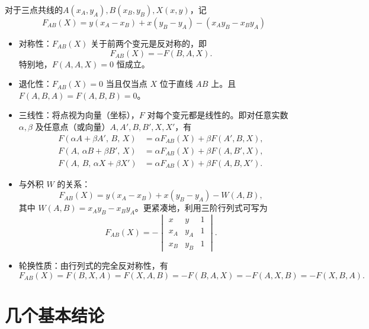 \begin{definition}[直线式 $F$]
    对于三点共线的$A(x_A,y_A),B(x_B,y_B),X(x,y)$，记
    \[F_{AB}(X)=y(x_A-x_B)+x(y_B-y_A)-(x_Ay_B-x_By_A)\]
\end{definition}
\begin{itemize}
    \item 对称性：$F_{AB}(X)$ 关于前两个变元是反对称的，即
    $$ F_{AB}(X) = -F(B,A,X). $$
    特别地，$F(A,A,X)=0$ 恒成立。
    \item 退化性：$F_{AB}(X)=0$ 当且仅当点 $X$ 位于直线 $AB$ 上。且 $F(A,B,A)=F(A,B,B)=0$。
    \item 三线性：将点视为向量（坐标），$F$ 对每个变元都是线性的。即对任意实数 $\alpha,\beta$ 及任意点（或向量）$A,A',B,B',X,X'$，有
    \begin{align*}
        F(\alpha A+\beta A',\,B,\,X) &= \alpha F_{AB}(X) + \beta F(A',B,X), \\
        F(A,\,\alpha B+\beta B',\,X) &= \alpha F_{AB}(X) + \beta F(A,B',X), \\
        F(A,\,B,\,\alpha X+\beta X') &= \alpha F_{AB}(X) + \beta F(A,B,X').
    \end{align*}
    \item 与外积 $W$ 的关系：
    $$ F_{AB}(X) = y(x_A-x_B) + x(y_B-y_A) - W(A,B), $$
    其中 $W(A,B)=x_Ay_B-x_By_A$。更紧凑地，利用三阶行列式可写为
    $$ F_{AB}(X) = -\begin{vmatrix}
        x & y & 1 \\
        x_A & y_A & 1 \\
        x_B & y_B & 1
    \end{vmatrix}. $$
    \item 轮换性质：由行列式的完全反对称性，有
    $$ F_{AB}(X) = F(B,X,A) = F(X,A,B) = -F(B,A,X) = -F(A,X,B) = -F(X,B,A). $$
\end{itemize}

\section{几个基本结论}

